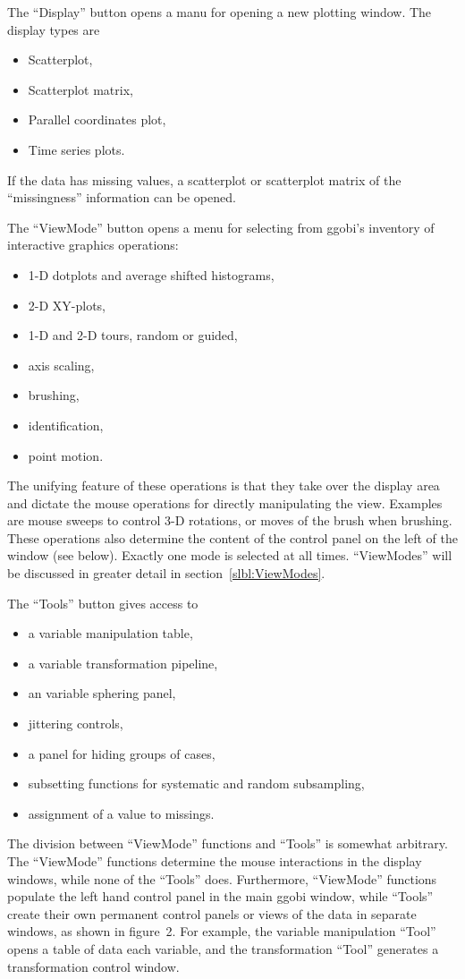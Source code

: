 \documentclass[11pt]{article}
\begin{document}
The ``Display'' button opens a manu for opening a new plotting
window.  The display types are
\begin{itemize}
\itemsep 0em
\item Scatterplot,
\item Scatterplot matrix, 
\item Parallel coordinates plot,
\item Time series plots.
\end{itemize}

If the data has missing values, a scatterplot or scatterplot matrix
of the ``missingness'' information can be opened.

The ``ViewMode'' button opens a menu for selecting from ggobi's
inventory of interactive graphics operations: 
\begin{itemize}
\itemsep 0em
\item 1-D dotplots and average shifted histograms,
\item 2-D XY-plots, 
\item 1-D and 2-D tours, random or guided,
\item axis scaling,
\item brushing, 
\item identification, 
\item point motion.  
\end{itemize}

The unifying feature of these operations is that they take over the
display area and dictate the mouse operations for directly
manipulating the view.  Examples are mouse sweeps to control 3-D
rotations, or moves of the brush when brushing.  These operations
also determine the content of the control panel on the left of the
window (see below).  Exactly one mode is selected at all times.
``ViewModes'' will be discussed in greater detail in
section~\ref{slbl:ViewModes}.

The ``Tools'' button gives access to 
\begin{itemize}
\itemsep 0em
\item a variable manipulation table,
\item a variable transformation pipeline,
\item an variable sphering panel,
\item jittering controls,
\item a panel for hiding groups of cases,
\item subsetting functions for systematic and random subsampling, 
\item assignment of a value to missings.

\end{itemize}
The division between ``ViewMode'' functions and ``Tools'' is somewhat
arbitrary.  The ``ViewMode'' functions determine the mouse
interactions in the display windows, while none of the ``Tools''
does.  Furthermore, ``ViewMode'' functions populate the left hand
control panel in the main ggobi window, while ``Tools'' create their
own permanent control panels or views of the data in separate
windows, as shown in figure~2.  For example, the variable
manipulation ``Tool'' opens a table of data each variable, and the
transformation ``Tool'' generates a transformation control window.
\end{document}
